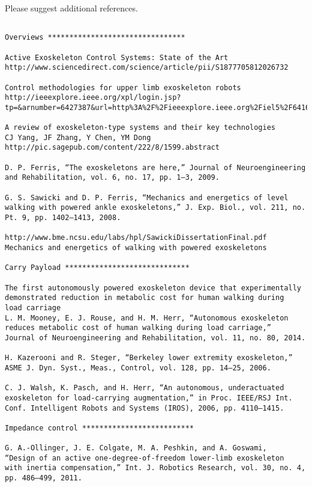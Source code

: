 \documentclass[letterpaper,12pt,fullpage]{article}
\begin{document}
Please suggest additional references.

\begin{verbatim}

Overviews ********************************

Active Exoskeleton Control Systems: State of the Art
http://www.sciencedirect.com/science/article/pii/S1877705812026732

Control methodologies for upper limb exoskeleton robots
http://ieeexplore.ieee.org/xpl/login.jsp?tp=&arnumber=6427387&url=http%3A%2F%2Fieeexplore.ieee.org%2Fiel5%2F6416132%2F6426928%2F06427387.pdf%3Farnumber%3D6427387

A review of exoskeleton-type systems and their key technologies
CJ Yang, JF Zhang, Y Chen, YM Dong
http://pic.sagepub.com/content/222/8/1599.abstract

D. P. Ferris, “The exoskeletons are here,” Journal of Neuroengineering
and Rehabilitation, vol. 6, no. 17, pp. 1–3, 2009.

G. S. Sawicki and D. P. Ferris, “Mechanics and energetics of level
walking with powered ankle exoskeletons,” J. Exp. Biol., vol. 211, no.
Pt. 9, pp. 1402–1413, 2008.

http://www.bme.ncsu.edu/labs/hpl/SawickiDissertationFinal.pdf
Mechanics and energetics of walking with powered exoskeletons

Carry Payload *****************************

The first autonomously powered exoskeleton device that experimentally
demonstrated reduction in metabolic cost for human walking during
load carriage
L. M. Mooney, E. J. Rouse, and H. M. Herr, “Autonomous exoskeleton
reduces metabolic cost of human walking during load carriage,”
Journal of Neuroengineering and Rehabilitation, vol. 11, no. 80, 2014.

H. Kazerooni and R. Steger, “Berkeley lower extremity exoskeleton,”
ASME J. Dyn. Syst., Meas., Control, vol. 128, pp. 14–25, 2006.

C. J. Walsh, K. Pasch, and H. Herr, “An autonomous, underactuated
exoskeleton for load-carrying augmentation,” in Proc. IEEE/RSJ Int.
Conf. Intelligent Robots and Systems (IROS), 2006, pp. 4110–1415.

Impedance control **************************

G. A.-Ollinger, J. E. Colgate, M. A. Peshkin, and A. Goswami,
“Design of an active one-degree-of-freedom lower-limb exoskeleton
with inertia compensation,” Int. J. Robotics Research, vol. 30, no. 4,
pp. 486–499, 2011.


\end{verbatim}
\end{document}
